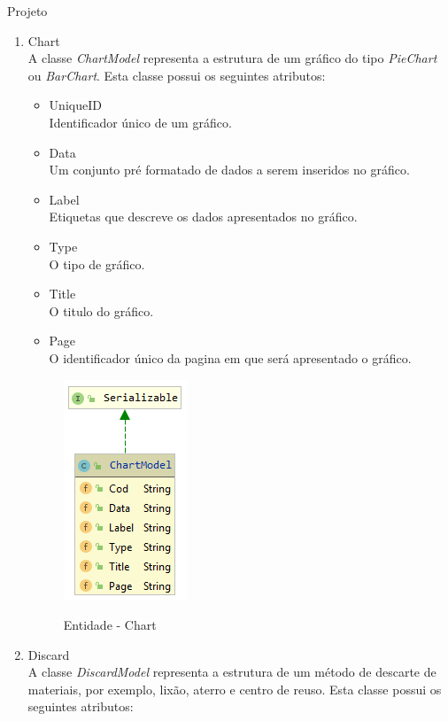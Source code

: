 \documentclass[
	12pt,				%
	openright,			%
	twoside,			%
	a4paper,			%
	english,			%
	french,				%
	spanish,			%
	brazil				%
	]{abntex2}
\begin{document}
\begin{chapter}{Projeto}
\begin{enumerate}
  \item{Chart}   \\ A classe \textit{ChartModel} representa a estrutura de um gráfico do tipo \textit{PieChart} ou \textit{BarChart}. Esta classe possui os seguintes atributos:
  
  \begin{itemize}
  \item{UniqueID}\\ Identificador único de um gráfico.
     \item{Data}\\ Um conjunto pré formatado de dados a serem inseridos no gráfico.
       \item{Label}\\ Etiquetas que descreve os dados apresentados no gráfico.
         \item{Type}\\ O tipo de gráfico.
         \item{Title}\\ O titulo do gráfico.
         \item{Page}\\  O identificador único da pagina em que será apresentado o gráfico.
\end{itemize}
  
\begin{figure}[h]
\centering
   \caption{Entidade - Chart}
   \includegraphics[scale=1.0]{media/chartModel.png}
     \label{fig:chartModel}
\end{figure}


  \item{Discard}   \\ A classe \textit{DiscardModel} representa a estrutura de um método de descarte de materiais, por exemplo, lixão, aterro e centro de reuso. Esta classe possui os seguintes atributos:
  

\end{enumerate}
\end{chapter}
\end{document}
